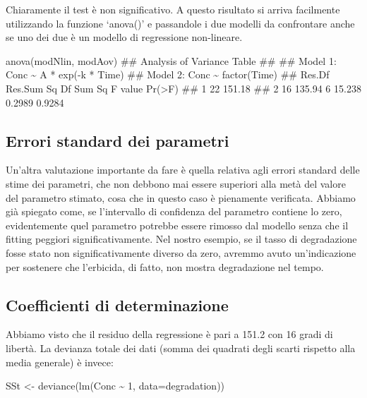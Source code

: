 \documentclass[a4paper,12pt,oneside]{book}
\newenvironment{Shaded}{\begin{snugshade}}{\end{snugshade}}
\newcommand{\DecValTok}[1]{#1}
\newcommand{\SpecialCharTok}[1]{#1}
\newcommand{\DocumentationTok}[1]{#1}
\newcommand{\OtherTok}[1]{#1}
\newcommand{\FunctionTok}[1]{#1}
\newcommand{\AttributeTok}[1]{#1}
\newcommand{\NormalTok}[1]{#1}
\begin{document}
Chiaramente il test è non significativo. A questo risultato si arriva facilmente utilizzando la funzione `anova()' e passandole i due modelli da confrontare anche se uno dei due è un modello di regressione non-lineare.

\begin{Shaded}
\begin{Highlighting}[]
\FunctionTok{anova}\NormalTok{(modNlin, modAov)}
\DocumentationTok{\#\# Analysis of Variance Table}
\DocumentationTok{\#\# }
\DocumentationTok{\#\# Model 1: Conc \textasciitilde{} A * exp({-}k * Time)}
\DocumentationTok{\#\# Model 2: Conc \textasciitilde{} factor(Time)}
\DocumentationTok{\#\#   Res.Df Res.Sum Sq Df Sum Sq F value Pr(\textgreater{}F)}
\DocumentationTok{\#\# 1     22     151.18                         }
\DocumentationTok{\#\# 2     16     135.94  6 15.238  0.2989 0.9284}
\end{Highlighting}
\end{Shaded}

\hypertarget{errori-standard-dei-parametri-1}{%
\subsection{Errori standard dei parametri}\label{errori-standard-dei-parametri-1}}

Un'altra valutazione importante da fare è quella relativa agli errori standard delle stime dei parametri, che non debbono mai essere superiori alla metà del valore del parametro stimato, cosa che in questo caso è pienamente verificata. Abbiamo già spiegato come, se l'intervallo di confidenza del parametro contiene lo zero, evidentemente quel parametro potrebbe essere rimosso dal modello senza che il fitting peggiori significativamente. Nel nostro esempio, se il tasso di degradazione fosse stato non significativamente diverso da zero, avremmo avuto un'indicazione per sostenere che l'erbicida, di fatto, non mostra degradazione nel tempo.

\hypertarget{coefficienti-di-determinazione}{%
\subsection{Coefficienti di determinazione}\label{coefficienti-di-determinazione}}

Abbiamo visto che il residuo della regressione è pari a 151.2 con 16 gradi di libertà. La devianza totale dei dati (somma dei quadrati degli scarti rispetto alla media generale) è invece:

\begin{Shaded}
\begin{Highlighting}[]
\NormalTok{SSt }\OtherTok{\textless{}{-}} \FunctionTok{deviance}\NormalTok{(}\FunctionTok{lm}\NormalTok{(Conc }\SpecialCharTok{\textasciitilde{}} \DecValTok{1}\NormalTok{, }\AttributeTok{data=}\NormalTok{degradation))}
\end{Highlighting}
\end{Shaded}
\end{document}
